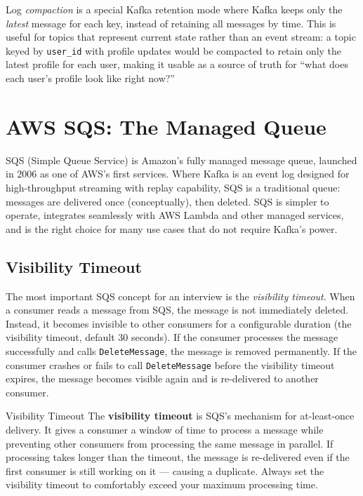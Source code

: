 \documentclass[11pt,a4paper]{article}
\begin{document}
Log \textit{compaction} is a special Kafka retention mode where Kafka keeps only the \textit{latest} message for each key, instead of retaining all messages by time. This is useful for topics that represent current state rather than an event stream: a topic keyed by \texttt{user\_id} with profile updates would be compacted to retain only the latest profile for each user, making it usable as a source of truth for ``what does each user's profile look like right now?''

\section{AWS SQS: The Managed Queue}

SQS (Simple Queue Service) is Amazon's fully managed message queue, launched in 2006 as one of AWS's first services. Where Kafka is an event log designed for high-throughput streaming with replay capability, SQS is a traditional queue: messages are delivered once (conceptually), then deleted. SQS is simpler to operate, integrates seamlessly with AWS Lambda and other managed services, and is the right choice for many use cases that do not require Kafka's power.

\subsection{Visibility Timeout}

The most important SQS concept for an interview is the \textit{visibility timeout}. When a consumer reads a message from SQS, the message is not immediately deleted. Instead, it becomes invisible to other consumers for a configurable duration (the visibility timeout, default 30 seconds). If the consumer processes the message successfully and calls \texttt{DeleteMessage}, the message is removed permanently. If the consumer crashes or fails to call \texttt{DeleteMessage} before the visibility timeout expires, the message becomes visible again and is re-delivered to another consumer.

\begin{termbox}{Visibility Timeout}
The \textbf{visibility timeout} is SQS's mechanism for at-least-once delivery. It gives a consumer a window of time to process a message while preventing other consumers from processing the same message in parallel. If processing takes longer than the timeout, the message is re-delivered even if the first consumer is still working on it --- causing a duplicate. Always set the visibility timeout to comfortably exceed your maximum processing time.
\end{termbox}
\end{document}
